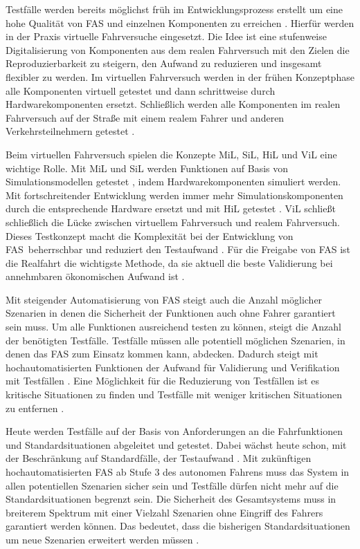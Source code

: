 Testfälle werden bereits möglichst früh im Entwicklungsprozess erstellt um eine hohe Qualität von \ac{FAS} und einzelnen Komponenten zu erreichen \cite{wachenfeld2015freigabe}. Hierfür werden in der Praxis virtuelle Fahrversuche eingesetzt. Die Idee ist eine stufenweise Digitalisierung von Komponenten aus dem realen Fahrversuch mit den Zielen die Reproduzierbarkeit zu steigern, den Aufwand zu reduzieren und insgesamt flexibler zu werden. Im virtuellen Fahrversuch werden in der frühen Konzeptphase alle Komponenten virtuell getestet und dann schrittweise durch Hardwarekomponenten ersetzt. Schließlich werden alle Komponenten im realen Fahrversuch auf der Straße mit einem realem Fahrer und anderen Verkehrsteilnehmern getestet \cite{hakuli2015virtuelle}.

Beim virtuellen Fahrversuch spielen die Konzepte \ac{MiL}, \ac{SiL}, \ac{HiL} und \ac{ViL} eine wichtige Rolle. Mit \ac{MiL} und \ac{SiL} werden Funktionen auf Basis von Simulationsmodellen getestet \cite{berg2015vehicle}, indem Hardwarekomponenten simuliert werden. Mit fortschreitender Entwicklung werden immer mehr Simulationskomponenten durch die entsprechende Hardware ersetzt und mit \ac{HiL} getestet \cite{hakuli2015virtuelle}. \ac{ViL} schließt schließlich die Lücke zwischen virtuellem Fahrversuch und realem Fahrversuch. Dieses Testkonzept macht die Komplexität bei der Entwicklung von \ac{FAS} beherrschbar und reduziert den Testaufwand \cite{schwab2014durchgangige}. Für die Freigabe von \ac{FAS} ist die Realfahrt die wichtigste Methode, da sie aktuell die beste Validierung bei annehmbaren ökonomischen Aufwand ist \cite{wachenfeld2015freigabe}.

Mit steigender Automatisierung von \ac{FAS} steigt auch die Anzahl möglicher Szenarien in denen die Sicherheit der Funktionen auch ohne Fahrer garantiert sein muss. Um alle Funktionen ausreichend testen zu können, steigt die Anzahl der benötigten Testfälle. Testfälle müssen alle potentiell möglichen Szenarien, in denen das \ac{FAS} zum Einsatz kommen kann, abdecken. Dadurch steigt mit hochautomatisierten Funktionen der Aufwand für Validierung und Verifikation mit Testfällen \cite{bach2017reactive}. Eine Möglichkeit für die Reduzierung von Testfällen ist es kritische Situationen zu finden und Testfälle mit weniger kritischen Situationen zu entfernen \cite{wachenfeld2015freigabe}.

Heute werden Testfälle auf der Basis von Anforderungen an die Fahrfunktionen und Standardsituationen abgeleitet und getestet. Dabei wächst heute schon, mit der Beschränkung auf Standardfälle, der Testaufwand \cite{surmund2018neue}. Mit zukünftigen hochautomatisierten \ac{FAS} ab Stufe 3 des autonomen Fahrens muss das System in allen potentiellen Szenarien sicher sein und Testfälle dürfen nicht mehr auf die Standardsituationen begrenzt sein. Die Sicherheit des Gesamtsystems muss in breiterem Spektrum mit einer Vielzahl Szenarien ohne Eingriff des Fahrers garantiert werden können. Das bedeutet, dass die bisherigen Standardsituationen um neue Szenarien erweitert werden müssen \cite{surmund2018neue}.

